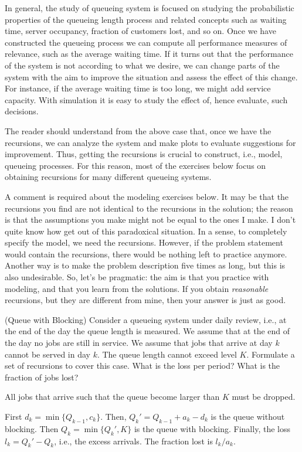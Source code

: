 In general, the study of queueing system is focused on
studying the probabilistic properties of the queueing length process
and related concepts such as waiting time, server occupancy, fraction
of customers lost, and so on. Once we have constructed the queueing
process we can compute all performance measures of relevance, such as
the average waiting time. If it turns out that the
performance of the system is not according to what we desire, we can
change parts of the system with the aim to improve the situation and
assess the effect of this change.  For instance, if the average
waiting time is too long, we might add service capacity. With simulation it is easy to study the effect of, hence
evaluate, such decisions.

The reader should understand from the above case that, once we have
the recursions, we can analyze the system and make plots to evaluate
suggestions for improvement.  Thus, getting the recursions is crucial
to construct, i.e., model, queueing processes. For this reason, most
of the exercises below focus on obtaining recursions for many
different queueing systems. 

\begin{remark}
A comment is required about the modeling exercises below. It may be
that the recursions you find are not identical to the recursions in
the solution; the reason is that the assumptions you make might not be
equal to the ones I make. I don't quite know how get out of this
paradoxical situation.  In a sense, to completely specify the model,
we need the recursions. However, if the problem statement would
contain the recursions, there would be nothing left to practice
anymore. Another way is to make the problem description five times as
long, but this is also undesirable. So, let's be pragmatic: the aim is
that you practice with modeling, and that you learn from the
solutions.  If you obtain \emph{reasonable} recursions, but they are
different from mine, then your answer is just as good.
\end{remark}

\begin{exercise} (Queue with Blocking) Consider a queueing system
  under daily review, i.e., at the end of the day the queue length is
  measured. We assume that at the end of the day no jobs are still in
  service. We assume that jobs that arrive at day $k$ cannot be served
  in day $k$. The queue length cannot exceed level $K$.  Formulate a
  set of recursions to cover this case. What is the loss per period? What is the fraction of jobs lost?
  \begin{solution}

    All jobs that arrive such that the queue become larger than $K$
    must be dropped. 

First $d_k = \min\{Q_{k-1}, c_k\}$. Then, $Q_k' = Q_{k-1}+a_k-d_k$ is the queue without blocking. Then $Q_k=\min\{Q_k', K\}$ is the queue with blocking. Finally, the loss $l_k=Q_k'-Q_k$, i.e., the excess arrivals. The fraction lost is $l_k/a_k$. 
  \end{solution}
\end{exercise}

